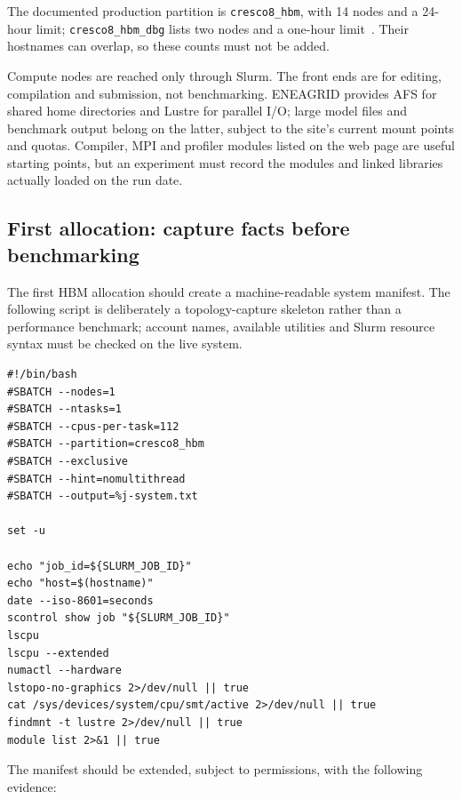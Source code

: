 The documented production partition is \texttt{cresco8\_hbm}, with 14
nodes and a 24-hour limit; \texttt{cresco8\_hbm\_dbg} lists two nodes
and a one-hour limit~\cite{cresco8doc}.  Their hostnames can overlap, so
these counts must not be added.

Compute nodes are reached only through Slurm.  The front ends are for
editing, compilation and submission, not benchmarking.  ENEAGRID
provides AFS for shared home directories and Lustre for parallel I/O;
large model files and benchmark output belong on the latter, subject to
the site's current mount points and quotas.  Compiler, MPI and profiler
modules listed on the web page are useful starting points, but an
experiment must record the modules and linked libraries actually loaded
on the run date.

\subsection{First allocation: capture facts before benchmarking}
\label{sec:first-allocation}

The first HBM allocation should create a machine-readable system
manifest.  The following script is deliberately a topology-capture
skeleton rather than a performance benchmark; account names, available
utilities and Slurm resource syntax must be checked on the live system.

\begin{lstlisting}[style=shell,
  caption={Minimal exclusive allocation for a CRESCO8 topology
  manifest.}]
#!/bin/bash
#SBATCH --nodes=1
#SBATCH --ntasks=1
#SBATCH --cpus-per-task=112
#SBATCH --partition=cresco8_hbm
#SBATCH --exclusive
#SBATCH --hint=nomultithread
#SBATCH --output=%j-system.txt

set -u

echo "job_id=${SLURM_JOB_ID}"
echo "host=$(hostname)"
date --iso-8601=seconds
scontrol show job "${SLURM_JOB_ID}"
lscpu
lscpu --extended
numactl --hardware
lstopo-no-graphics 2>/dev/null || true
cat /sys/devices/system/cpu/smt/active 2>/dev/null || true
findmnt -t lustre 2>/dev/null || true
module list 2>&1 || true
\end{lstlisting}

The manifest should be extended, subject to permissions, with the
following evidence:

